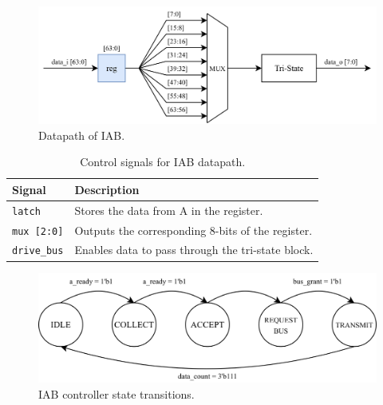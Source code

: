 \documentclass[../main.tex]{subfiles}
\begin{document}
\newpage

\begin{figure}[h]
    \centering
    \includegraphics[width=\linewidth]{assets/q3_dp.png}
    \caption{Datapath of IAB.}
    \label{fig:q3_dp}
\end{figure}

\begin{table}[h]
    \centering
    \renewcommand{\arraystretch}{1.2}
    \setlength{\tabcolsep}{8pt}

    \begin{tabularx}{\textwidth}{@{}lX@{}}
        \toprule
        \textbf{Signal} & \textbf{Description} \\
        \midrule
        \texttt{latch}      & Stores the data from A in the register.           \\
        \texttt{mux [2:0]}  & Outputs the corresponding 8-bits of the register. \\
        \texttt{drive\_bus} & Enables data to pass through the tri-state block. \\
        \bottomrule
    \end{tabularx}

    \caption{Control signals for IAB datapath.}
    \label{tab:q3_sig}
\end{table}

\begin{figure}[h]
    \centering
    \includegraphics[width=\linewidth]{assets/q3_cont.png}
    \caption{IAB controller state transitions.}
    \label{fig:q3_cont}
\end{figure}
\end{document}
